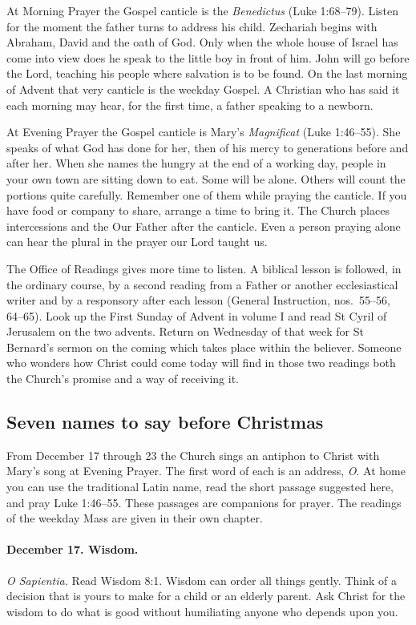 At Morning Prayer the Gospel canticle is the \emph{Benedictus} (Luke 1:68--79). Listen for the moment the father turns to address his child. Zechariah begins with Abraham, David and the oath of God. Only when the whole house of Israel has come into view does he speak to the little boy in front of him. John will go before the Lord, teaching his people where salvation is to be found. On the last morning of Advent that very canticle is the weekday Gospel. A Christian who has said it each morning may hear, for the first time, a father speaking to a newborn.

At Evening Prayer the Gospel canticle is Mary's \emph{Magnificat} (Luke 1:46--55). She speaks of what God has done for her, then of his mercy to generations before and after her. When she names the hungry at the end of a working day, people in your own town are sitting down to eat. Some will be alone. Others will count the portions quite carefully. Remember one of them while praying the canticle. If you have food or company to share, arrange a time to bring it. The Church places intercessions and the Our Father after the canticle. Even a person praying alone can hear the plural in the prayer our Lord taught us.

The Office of Readings gives more time to listen. A biblical lesson is followed, in the ordinary course, by a second reading from a Father or another ecclesiastical writer and by a responsory after each lesson (General Instruction, nos.~55--56, 64--65). Look up the First Sunday of Advent in volume I and read St Cyril of Jerusalem on the two advents. Return on Wednesday of that week for St Bernard's sermon on the coming which takes place within the believer. Someone who wonders how Christ could come today will find in those two readings both the Church's promise and a way of receiving it.

\subsection{Seven names to say before Christmas}

From December 17 through 23 the Church sings an antiphon to Christ with Mary's song at Evening Prayer. The first word of each is an address, \emph{O}. At home you can use the traditional Latin name, read the short passage suggested here, and pray Luke 1:46--55. These passages are companions for prayer. The readings of the weekday Mass are given in their own chapter.

\paragraph{December 17. Wisdom.} \emph{O Sapientia.} Read Wisdom 8:1. Wisdom can order all things gently. Think of a decision that is yours to make for a child or an elderly parent. Ask Christ for the wisdom to do what is good without humiliating anyone who depends upon you.

